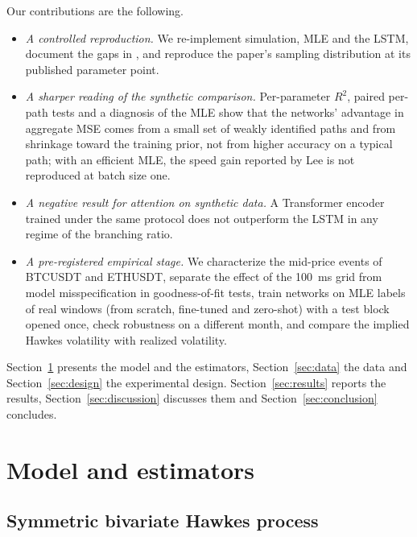 \documentclass[preprint,12pt,authoryear]{elsarticle}
\begin{document}
Our contributions are the following.
\begin{itemize}
  \item \emph{A controlled reproduction.} We re-implement simulation, MLE and the LSTM,
        document the gaps in \citet{lee2023}, and reproduce the paper's sampling
        distribution at its published parameter point.
  \item \emph{A sharper reading of the synthetic comparison.} Per-parameter $R^2$, paired
        per-path tests and a diagnosis of the MLE show that the networks' advantage in
        aggregate MSE comes from a small set of weakly identified paths and from shrinkage
        toward the training prior, not from higher accuracy on a typical path; with an
        efficient MLE, the speed gain reported by Lee is not reproduced at batch size one.
  \item \emph{A negative result for attention on synthetic data.} A Transformer encoder
        trained under the same protocol does not outperform the LSTM in any regime of the
        branching ratio.
  \item \emph{A pre-registered empirical stage.} We characterize the mid-price events of
        BTCUSDT and ETHUSDT, separate the effect of the 100~ms grid from model
        misspecification in goodness-of-fit tests, train networks on MLE labels of real
        windows (from scratch, fine-tuned and zero-shot) with a test block opened once,
        check robustness on a different month, and compare the implied Hawkes volatility
        with realized volatility.
\end{itemize}

Section~\ref{sec:model} presents the model and the estimators, Section~\ref{sec:data} the
data and Section~\ref{sec:design} the experimental design. Section~\ref{sec:results} reports
the results, Section~\ref{sec:discussion} discusses them and Section~\ref{sec:conclusion}
concludes.

\section{Model and estimators}
\label{sec:model}

\subsection{Symmetric bivariate Hawkes process}
\end{document}
